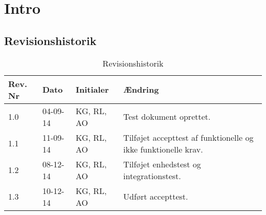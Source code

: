 \chapter{Intro}

\section{Revisionshistorik}

\begin{table}[H]
	\centering
		\begin{tabular}{|p{2 cm}|p{2 cm}|p{3 cm}|p{6 cm}|} 
		\hline
			\textbf{Rev. Nr} & \textbf{Dato}		& \textbf{Initialer} 	& \textbf{Ændring} \\ \hline
			1.0 	& 04-09-14	& KG, RL, AO		& Test dokument oprettet.	\\ \hline
			1.1 	& 11-09-14	& KG, RL, AO		& Tilføjet accepttest af funktionelle \newline og ikke funktionelle krav.\\ \hline
			1.2 	& 08-12-14	& KG, RL, AO		& Tilføjet enhedstest og integrationstest.	\\ \hline
			1.3 	& 10-12-14	& KG, RL, AO		& Udført accepttest.	\\ \hline
		\end{tabular}
	\caption{Revisionshistorik}
\end{table}

